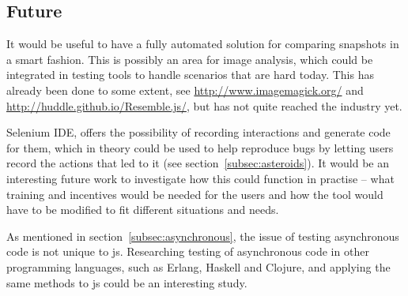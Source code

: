 \documentclass[11pt]{article}
\begin{document}
\subsection{Future}

It would be useful to have a fully automated solution for comparing snapshots in a smart fashion. This is possibly an area for image analysis, which could be integrated in testing tools to handle scenarios that are hard today. This has already been done to some extent, see \url{http://www.imagemagick.org/} and \url{http://huddle.github.io/Resemble.js/}, but has not quite reached the industry yet.

Selenium IDE, offers the possibility of recording interactions and generate code for them, which in theory could be used to help reproduce bugs by letting users record the actions that led to it (see section~\ref{subsec:asteroids}). It would be an interesting future work to investigate how this could function in practise -- what training and incentives would be needed for the users and how the tool would have to be modified to fit different situations and needs.

As mentioned in section~\ref{subsec:asynchronous}, the issue of testing asynchronous code is not unique to \gls{js}. Researching testing of asynchronous code in other programming languages, such as Erlang, Haskell and Clojure, and applying the same methods to \gls{js} could be an interesting study.

\printbibliography
\end{document}
